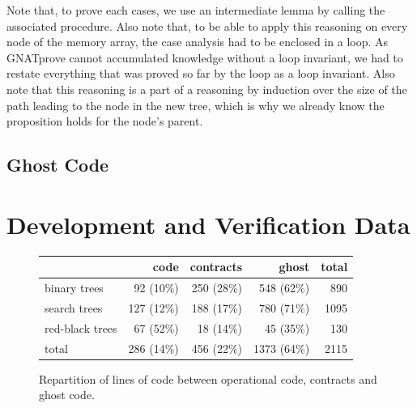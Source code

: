 \documentclass[11pt,a4paper]{article}
\begin{document}
Note that, to prove each cases, we use an intermediate lemma by calling the associated procedure.
Also note that, to be able to apply this reasoning on every node of the memory array, the case
analysis had to be enclosed in a loop. As GNATprove cannot accumulated knowledge without a loop
invariant, we had to restate everything that was proved so far by the loop as a loop invariant.
Also note that this reasoning is a part of a reasoning by induction over the size of the path
leading to the node in the new tree, which is why we already know the proposition holds for the
node's parent.

\subsection{Ghost Code}



\section{Development and Verification Data}

\begin{figure}[ht]
\begin{center}
\begin{tabular}{l|rrr|r}
                & code       & contracts  &      ghost  & total \\ \hline
binary trees    & 92  (10\%) & 250 (28\%) & 548  (62\%) & 890 \\
search trees    & 127 (12\%) & 188 (17\%) & 780  (71\%) & 1095 \\
red-black trees & 67  (52\%) & 18  (14\%) & 45   (35\%) & 130 \\ \hline
total           & 286 (14\%) & 456 (22\%) & 1373 (64\%) & 2115 \\
\end{tabular}
\caption{\label{tab-sloc} Repartition of lines of code between operational code, contracts and ghost code.}
\end{center}
\end{figure}
\end{document}
